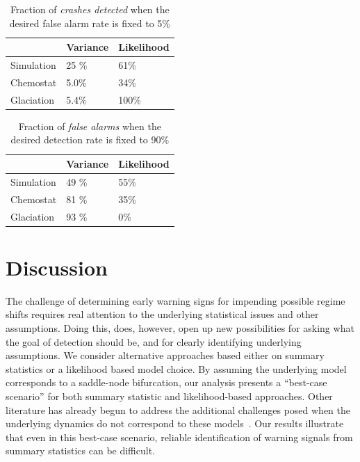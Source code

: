 \documentclass[authoryear,review,11pt]{elsarticle}
\begin{document}
\begin{table}
  \begin{center}
    \begin{tabular}{l|l|l}
                  &  Variance & Likelihood \\ 
      \hline
      Simulation  & 25 \%     & 61\% \\
      Chemostat   & 5.0\%     & 34\% \\
      Glaciation  & 5.4\%     & 100\% 
    \end{tabular}
    \caption{Fraction of \emph{crashes detected} when the desired false alarm rate is fixed to 5\%}
    \label{tab:falsepos}
  \end{center}
\end{table}

\begin{table}
  \begin{center}
    \begin{tabular}{l|l|l}
                  &  Variance & Likelihood \\ 
      \hline
      Simulation  & 49 \%     & 55\% \\
      Chemostat   & 81 \%     & 35\% \\
      Glaciation  & 93 \%     & 0\% 
    \end{tabular}
    \caption{Fraction of \emph{false alarms} when the desired detection rate is fixed to 90\%}
    \label{tab:truepos}
  \end{center}
\end{table}


\section{Discussion}

The challenge of determining early warning signs for impending possible regime shifts 
requires real attention to the underlying statistical issues and other assumptions.  
Doing this, does, however, open up new possibilities for asking what the goal of detection should be, 
and for clearly identifying underlying assumptions. 
We consider alternative approaches based either on summary statistics or a likelihood based model choice.  
By assuming the underlying model corresponds to a saddle-node bifurcation,
our analysis presents a ``best-case scenario'' for both  summary statistic and  likelihood-based approaches.
Other literature has already begun to address the additional challenges posed when the underlying
dynamics do not correspond to these models~\citep{Hastings2010}.
Our results illustrate that even in this best-case scenario,
reliable identification of warning signals from summary statistics can be difficult.
\end{document}
